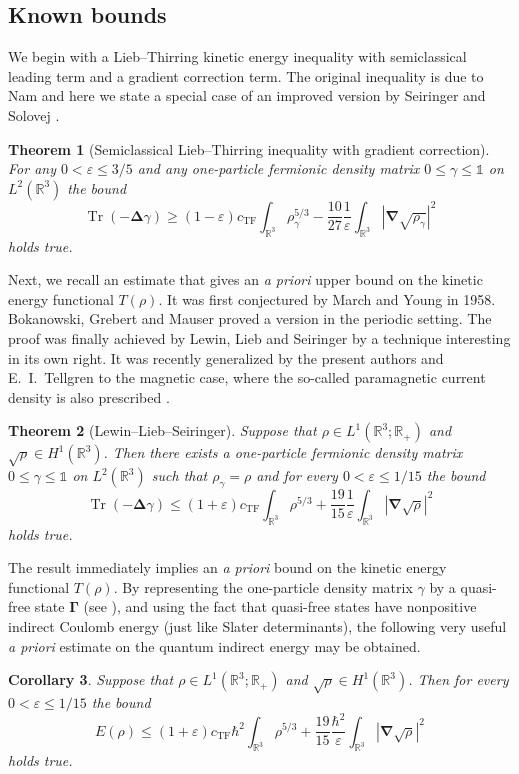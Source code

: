 \documentclass[final,onefignum,onetabnum,reqno]{amsart}
\newtheorem{theorem}{Theorem}[section]
\newtheorem{corollary}[theorem]{Corollary}
\theoremstyle{remark}
\renewcommand{\le}{\leqslant}
\renewcommand{\ge}{\geqslant}
\renewcommand{\epsilon}{\varepsilon}
\DeclareMathOperator{\Tr}{Tr}
\newcommand{\RR}{\mathbb{R}}
\newcommand{\vGamma}{{\bm{\Gamma}}} %
\newcommand{\TF}{\mathrm{TF}} %
\newcommand{\iden}{\mathbb{1}} %
\newcommand{\lapl}{\bm{\Delta}} %
\newcommand{\grad}{\bm{\nabla}} %
\begin{document}
\subsection{Known bounds}\label{qknownbd}
We begin with a Lieb--Thirring kinetic energy inequality with semiclassical leading term and a gradient correction term. The original inequality is due to Nam \cite{nam2018lieb} and 
here we state a special case of an improved version by Seiringer and Solovej \cite{seiringer2023simple}.
\begin{theorem}[Semiclassical Lieb--Thirring inequality with gradient correction]\label{ltsemi}
For any $0<\epsilon\le 3/5$ and any one-particle fermionic density matrix  $0\le\gamma\le\iden$ on $L^2(\RR^3)$ the bound
$$
\Tr(-\lapl\gamma)\ge (1-\epsilon) c_\TF \int_{\RR^3} \rho_\gamma^{5/3} - \frac{10}{27} \frac{1}{\epsilon}\int_{\RR^3} |\grad\sqrt{\rho_\gamma}|^2 
$$
holds true.
\end{theorem}

Next, we recall an estimate that gives an \emph{a priori} upper bound on the kinetic energy functional $T(\rho)$. It was first conjectured by March and Young \cite{march1958variational} in 1958. Bokanowski, Grebert and Mauser \cite{bokanowski2003local} proved a version in the periodic setting. 
The proof was finally achieved by Lewin, Lieb and Seiringer \cite{lewin2020local} by a technique interesting in its own right. It was recently generalized by the present authors and E.~I.~Tellgren to the magnetic case, where the so-called paramagnetic current density is also prescribed \cite{csirik2024thermodynamic}.

\begin{theorem}[Lewin--Lieb--Seiringer]\label{llsbound}
Suppose that $\rho\in L^1(\RR^3;\RR_+)$ and $\sqrt{\rho}\in H^1(\RR^3)$. Then there exists a one-particle fermionic density matrix $0\le\gamma\le\iden$ on $L^2(\RR^3)$ such that $\rho_\gamma=\rho$ and for every $0<\epsilon\le 1/15$ the bound
$$
\Tr(-\lapl\gamma)\le (1+\epsilon)c_\TF \int_{\RR^3} \rho^{5/3} + \frac{19}{15}\frac{1}{\epsilon} \int_{\RR^3} |\grad\sqrt{\rho}|^2
$$
holds true.
\end{theorem}

The result immediately implies an \emph{a priori} bound on the kinetic energy functional
$T(\rho)$.
By representing the one-particle density matrix $\gamma$ by a quasi-free state $\vGamma$ (see \cite{bach1994generalized}), and using the fact that quasi-free states have nonpositive indirect Coulomb energy (just like Slater determinants), the following very useful \emph{a priori} estimate on the quantum indirect energy may be obtained.
\begin{corollary}\label{llsebound}
Suppose that $\rho\in L^1(\RR^3;\RR_+)$ and $\sqrt{\rho}\in H^1(\RR^3)$. Then for every $0<\epsilon\le 1/15$ the bound
$$
E(\rho)\le (1+\epsilon)c_\TF\hbar^2 \int_{\RR^3} \rho^{5/3} + \frac{19}{15}\frac{\hbar^2}{\epsilon} \int_{\RR^3} |\grad\sqrt{\rho}|^2
$$
holds true. 
\end{corollary}
\end{document}
